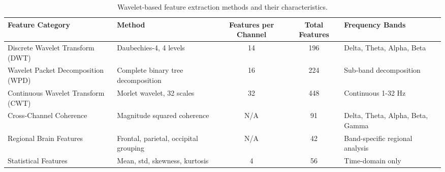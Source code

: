 \begin{table}
\caption{Wavelet-based feature extraction methods and their characteristics.}
\label{tab:feature_extraction}
\begin{tabular}{l|l|c|c|p{3cm}}
\toprule
Feature Category & Method & Features per Channel & Total Features & Frequency Bands \\
\midrule
Discrete Wavelet Transform (DWT) & Daubechies-4, 4 levels & 14 & 196 & Delta, Theta, Alpha, Beta \\
Wavelet Packet Decomposition (WPD) & Complete binary tree decomposition & 16 & 224 & Sub-band decomposition \\
Continuous Wavelet Transform (CWT) & Morlet wavelet, 32 scales & 32 & 448 & Continuous 1-32 Hz \\
Cross-Channel Coherence & Magnitude squared coherence & N/A & 91 & Delta, Theta, Alpha, Beta, Gamma \\
Regional Brain Features & Frontal, parietal, occipital grouping & N/A & 42 & Band-specific regional analysis \\
Statistical Features & Mean, std, skewness, kurtosis & 4 & 56 & Time-domain only \\
\bottomrule
\end{tabular}
\end{table}
